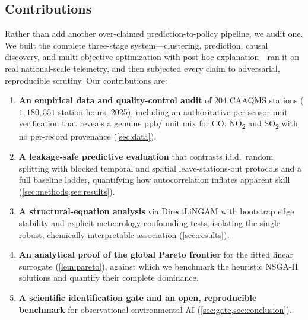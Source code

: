 \subsection{Contributions}
Rather than add another over-claimed prediction-to-policy pipeline, we audit one. We
built the complete three-stage system---clustering, prediction, causal discovery, and
multi-objective optimization with post-hoc explanation---ran it on real national-scale
telemetry, and then subjected every claim to adversarial, reproducible scrutiny. Our
contributions are:
\begin{enumerate}
  \item \textbf{An empirical data and quality-control audit} of $204$ CAAQMS stations
  ($1{,}180{,}551$ station-hours, 2025), including an authoritative per-sensor unit
  verification that reveals a genuine ppb/\ugm{} unit mix for CO, NO\textsubscript{2}
  and SO\textsubscript{2} with no per-record provenance (\cref{sec:data}).
  \item \textbf{A leakage-safe predictive evaluation} that contrasts i.i.d.\ random
  splitting with blocked temporal and spatial leave-stations-out protocols and a full
  baseline ladder, quantifying how autocorrelation inflates apparent skill
  (\cref{sec:methods,sec:results}).
  \item \textbf{A structural-equation analysis} via DirectLiNGAM with bootstrap edge
  stability and explicit meteorology-confounding tests, isolating the single robust,
  chemically interpretable association (\cref{sec:results}).
  \item \textbf{An analytical proof of the global Pareto frontier} for the fitted
  linear surrogate (\cref{lem:pareto}), against which we benchmark the heuristic
  NSGA-II solutions and quantify their complete dominance.
  \item \textbf{A scientific identification gate and an open, reproducible benchmark}
  for observational environmental AI (\cref{sec:gate,sec:conclusion}).
\end{enumerate}
